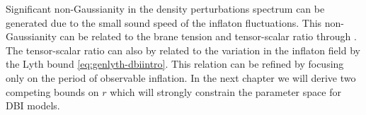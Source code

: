 Significant non-Gaussianity in the density perturbations spectrum can be generated
due to the small sound speed of the inflaton fluctuations.
This non-Gaussianity can be related to the brane tension and tensor-scalar ratio
through . The tensor-scalar ratio can also by related to the variation in
the inflaton field by the Lyth bound \eqref{eq:genlyth-dbiintro}. This relation can be refined by
focusing only on the period of observable inflation. 
% 
In the next chapter we will derive two
competing bounds on $r$ which will strongly constrain the parameter space for
DBI models.


